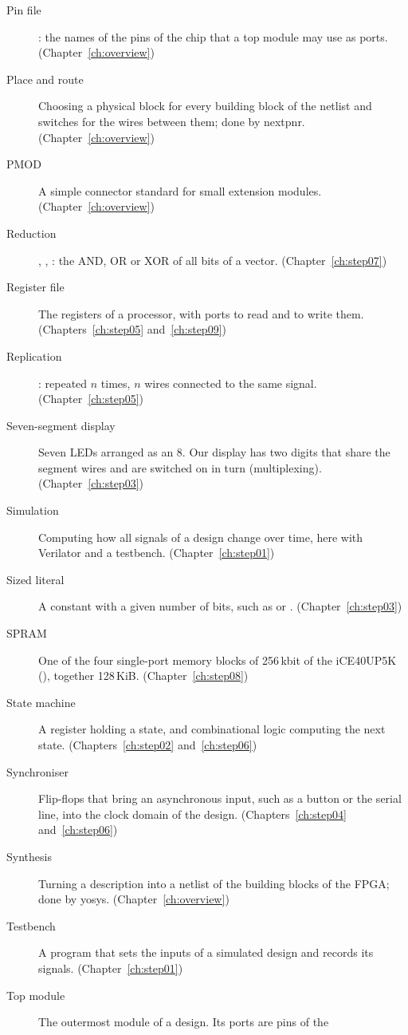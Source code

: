 \begin{description}
\item[Pin file] : the names of the pins of the chip that a
  top module may use as ports. (Chapter~\ref{ch:overview})
\item[Place and route] Choosing a physical block for every building block of
  the netlist and switches for the wires between them; done by nextpnr.
  (Chapter~\ref{ch:overview})
\item[PMOD] A simple connector standard for small extension modules.
  (Chapter~\ref{ch:overview})
\item[Reduction] , , : the AND, OR or XOR of all bits
  of a vector. (Chapter~\ref{ch:step07})
\item[Register file] The registers of a processor, with ports to read and to
  write them. (Chapters~\ref{ch:step05} and~\ref{ch:step09})
\item[Replication] :  repeated $n$ times, $n$ wires
  connected to the same signal. (Chapter~\ref{ch:step05})
\item[Seven-segment display] Seven LEDs arranged as an 8. Our display has two
  digits that share the segment wires and are switched on in turn
  (multiplexing). (Chapter~\ref{ch:step03})
\item[Simulation] Computing how all signals of a design change over time, here
  with Verilator and a testbench. (Chapter~\ref{ch:step01})
\item[Sized literal] A constant with a given number of bits, such as
   or . (Chapter~\ref{ch:step03})
\item[SPRAM] One of the four single-port memory blocks of 256\,kbit of the
  iCE40UP5K (), together 128\,KiB.
  (Chapter~\ref{ch:step08})
\item[State machine] A register holding a state, and combinational logic
  computing the next state. (Chapters~\ref{ch:step02} and~\ref{ch:step06})
\item[Synchroniser] Flip-flops that bring an asynchronous input, such as a
  button or the serial line, into the clock domain of the design.
  (Chapters~\ref{ch:step04} and~\ref{ch:step06})
\item[Synthesis] Turning a description into a netlist of the building blocks
  of the FPGA; done by yosys. (Chapter~\ref{ch:overview})
\item[Testbench] A program that sets the inputs of a simulated design and
  records its signals. (Chapter~\ref{ch:step01})
\item[Top module] The outermost module of a design. Its ports are pins of the

\end{description}
